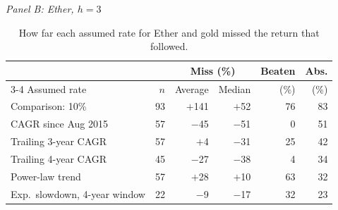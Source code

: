 \documentclass[12pt]{article}
\theoremstyle{plain}
\theoremstyle{remark}
\begin{document}
\begin{table}[H]
\centering
\caption{How far each assumed rate for Ether and gold missed the return that followed.}
\label{tab:calib}
\footnotesize\setlength{\tabcolsep}{2.4pt}
\textit{Panel B: Ether, $h=3$}\\[2pt]
\begin{tabular}{lrrrrr}
\toprule
 & & \multicolumn{2}{c}{Miss (\%)} & Beaten & Abs.\\
\cmidrule(lr){3-4}
Assumed rate & $n$ & Average & Median & (\%) & (\%)\\
\midrule
Comparison: 10\% & 93 & $+$141 & $+$52 & 76 & 83 \\
CAGR since Aug 2015 & 57 & $-$45 & $-$51 & 0 & 51 \\
Trailing 3-year CAGR & 57 & $+$4 & $-$31 & 25 & 42 \\
Trailing 4-year CAGR & 45 & $-$27 & $-$38 & 4 & 34 \\
Power-law trend & 57 & $+$28 & $+$10 & 63 & 32 \\
Exp.\ slowdown, 4-year window & 22 & $-$9 & $-$17 & 32 & 23 \\
\bottomrule
\end{tabular}


\end{table}
\end{document}
